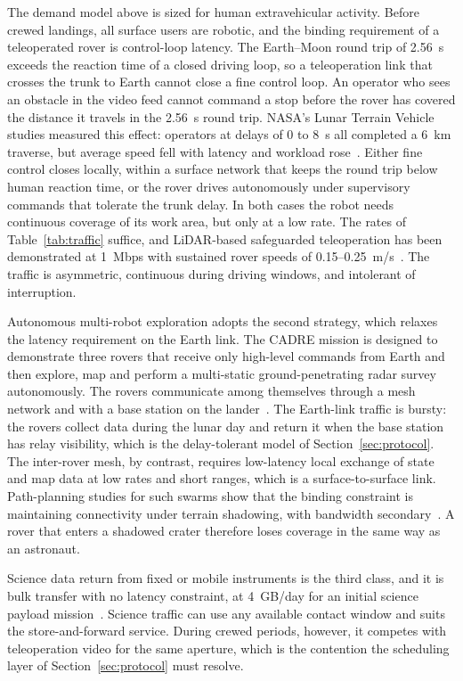 \documentclass{IEEEoj}
\begin{document}
The demand model above is sized for human extravehicular activity. Before crewed landings, all surface users are robotic, and the binding requirement of a teleoperated rover is control-loop latency. The Earth--Moon round trip of \SI{2.56}{\second} exceeds the reaction time of a closed driving loop, so a teleoperation link that crosses the trunk to Earth cannot close a fine control loop. An operator who sees an obstacle in the video feed cannot command a stop before the rover has covered the distance it travels in the \SI{2.56}{\second} round trip. NASA's Lunar Terrain Vehicle studies measured this effect: operators at delays of \SI{0}{} to \SI{8}{\second} all completed a \SI{6}{km} traverse, but average speed fell with latency and workload rose~\cite{ltv_teleops2025}. Either fine control closes locally, within a surface network that keeps the round trip below human reaction time, or the rover drives autonomously under supervisory commands that tolerate the trunk delay. In both cases the robot needs continuous coverage of its work area, but only at a low rate. The rates of Table~\ref{tab:traffic} suffice, and LiDAR-based safeguarded teleoperation has been demonstrated at \SI{1}{Mbps} with sustained rover speeds of \SI{0.15}{}--\SI{0.25}{m/s}~\cite{lidar_teleops2012}. The traffic is asymmetric, continuous during driving windows, and intolerant of interruption.

Autonomous multi-robot exploration adopts the second strategy, which relaxes the latency requirement on the Earth link. The CADRE mission is designed to demonstrate three rovers that receive only high-level commands from Earth and then explore, map and perform a multi-static ground-penetrating radar survey autonomously. The rovers communicate among themselves through a mesh network and with a base station on the lander~\cite{cadre_aero2024}. The Earth-link traffic is bursty: the rovers collect data during the lunar day and return it when the base station has relay visibility, which is the delay-tolerant model of Section~\ref{sec:protocol}. The inter-rover mesh, by contrast, requires low-latency local exchange of state and map data at low rates and short ranges, which is a surface-to-surface link. Path-planning studies for such swarms show that the binding constraint is maintaining connectivity under terrain shadowing, with bandwidth secondary~\cite{banfi_multirover2024}. A rover that enters a shadowed crater therefore loses coverage in the same way as an astronaut.

Science data return from fixed or mobile instruments is the third class, and it is bulk transfer with no latency constraint, at \SI{4}{GB/day} for an initial science payload mission~\cite{nasa_arts_comm}. Science traffic can use any available contact window and suits the store-and-forward service. During crewed periods, however, it competes with teleoperation video for the same aperture, which is the contention the scheduling layer of Section~\ref{sec:protocol} must resolve.
\end{document}
